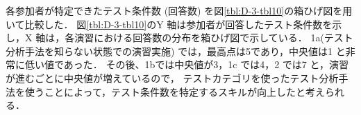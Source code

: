 \documentclass[a4paper,12pt]{jreport}
\begin{document}
各参加者が特定できたテスト条件数 (回答数) を図\ref{tbl:D-3-tbl10}の箱ひげ図を用いて比較した．
図\ref{tbl:D-3-tbl10}のY 軸は参加者が回答したテスト条件数を示し，X 軸は，各演習における回答数の分布を箱ひげ図で示している． 1a(テスト分析手法を知らない状態での演習実施) では，最高点は5であり，中央値は1 と非常に低い値であった．
その後、1bでは中央値が3，1c では4，2 では7 と，演習が進むごとに中央値が増えているので， テストカテゴリを使ったテスト分析手法を使うことによって，テスト条件数を特定するスキルが向上したと考えられる．
%
\end{document}
